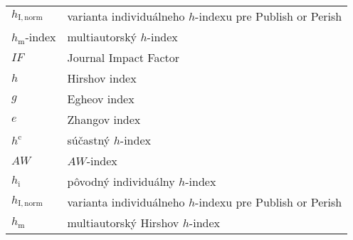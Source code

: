 \begin{flushleft}
\begin{longtable}[l]{ll}
    $h_{\mathrm{I, norm}}$ & varianta individuálneho $h$-indexu pre Publish or Perish\\[1mm]
    $h_{\mathrm{m}}$-index & multiautorský $h$-index \\[1.5em]
    $\mathit{IF}$          & Journal Impact Factor \\[1mm]
    $h$                    & Hirshov index \\[1mm]
    $g$                    & Egheov index \\[1mm]
    $e$                    & Zhangov index \\[1mm]
    $h^{\mathrm{c}}$       & súčastný $h$-index \\[1mm]
    $\mathit{AW}$          & $\mathit{AW}$-index \\[1mm]
    $h_{\mathrm{i}}$       & pôvodný individuálny $h$-index  \\[1mm]
    $h_{\mathrm{I, norm}}$ & varianta individuálneho $h$-indexu pre Publish or Perish\\[1mm]
    $h_{\mathrm{m}}$       & multiautorský Hirshov $h$-index  \\[1mm]
  \end{longtable}
\end{flushleft}

